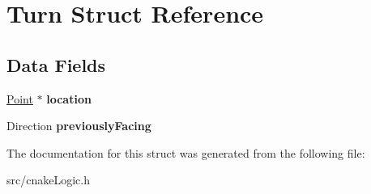 \hypertarget{struct_turn}{}\section{Turn Struct Reference}
\label{struct_turn}
\subsection*{Data Fields}
\begin{DoxyCompactItemize}
\item 
\hyperlink{struct_point}{Point} $\ast$ {\bfseries location}\hypertarget{struct_turn_a89408ee02ab1ebdda1bb89dbfd56f7a1}{}\label{struct_turn_a89408ee02ab1ebdda1bb89dbfd56f7a1}

\item 
Direction {\bfseries previously\+Facing}\hypertarget{struct_turn_ae9ae111db1693576cbeba6b699d8d1d2}{}\label{struct_turn_ae9ae111db1693576cbeba6b699d8d1d2}

\end{DoxyCompactItemize}


The documentation for this struct was generated from the following file\+:\begin{DoxyCompactItemize}
\item 
src/cnake\+Logic.\+h\end{DoxyCompactItemize}
